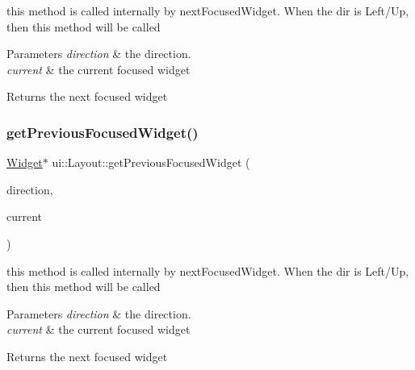 this method is called internally by next\+Focused\+Widget. When the dir is Left/\+Up, then this method will be called 
\begin{DoxyParams}{Parameters}
{\em direction} & the direction. \\
\hline
{\em current} & the current focused widget \\
\hline
\end{DoxyParams}
\begin{DoxyReturn}{Returns}
the next focused widget 
\end{DoxyReturn}
\mbox{\label{classui_1_1Layout_a1fed47b10c16b28b08c8cac5032f7249}} 
\subsubsection{\texorpdfstring{get\+Previous\+Focused\+Widget()}{getPreviousFocusedWidget()}\hspace{0.1cm}{\footnotesize\ttfamily [2/2]}}
{\footnotesize\ttfamily \hyperlink{classui_1_1Widget}{Widget}$\ast$ ui\+::\+Layout\+::get\+Previous\+Focused\+Widget (\begin{DoxyParamCaption}\item[{\hyperlink{classui_1_1Widget_a8ae8e8fc793a04a87584205cd1e8a8a5}{Focus\+Direction}}]{direction,  }\item[{\hyperlink{classui_1_1Widget}{Widget} $\ast$}]{current }\end{DoxyParamCaption})\hspace{0.3cm}{\ttfamily [protected]}}

this method is called internally by next\+Focused\+Widget. When the dir is Left/\+Up, then this method will be called 
\begin{DoxyParams}{Parameters}
{\em direction} & the direction. \\
\hline
{\em current} & the current focused widget \\
\hline
\end{DoxyParams}
\begin{DoxyReturn}{Returns}
the next focused widget 
\end{DoxyReturn}
\mbox{\label{classui_1_1Layout_af1792e929add190f4d14bef493139e5d}} 
